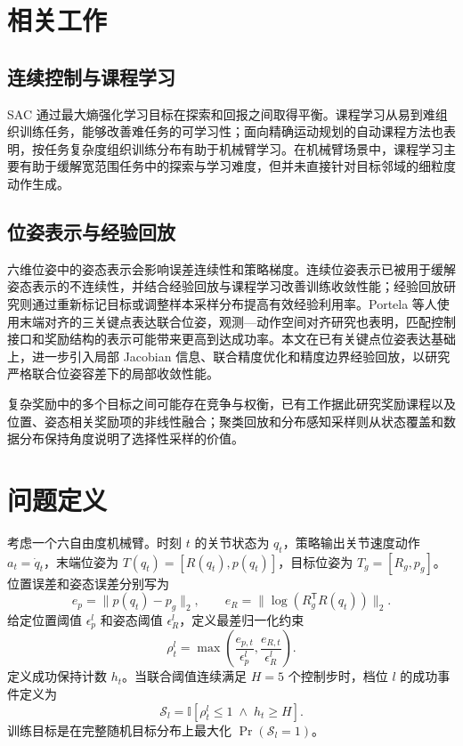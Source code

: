 \documentclass[conference]{IEEEtran}
\begin{document}
\section{相关工作}
\subsection{连续控制与课程学习}
SAC 通过最大熵强化学习目标在探索和回报之间取得平衡\cite{haarnoja2018sac}。课程学习从易到难组织训练任务，能够改善难任务的可学习性\cite{bengio2009curriculum}；面向精确运动规划的自动课程方法也表明，按任务复杂度组织训练分布有助于机械臂学习\cite{cho2025autocurriculum}。在机械臂场景中，课程学习主要有助于缓解宽范围任务中的探索与学习难度，但并未直接针对目标邻域的细粒度动作生成。

\subsection{位姿表示与经验回放}
六维位姿中的姿态表示会影响误差连续性和策略梯度。连续位姿表示已被用于缓解姿态表示的不连续性，并结合经验回放与课程学习改善训练收敛性能\cite{hu2025rtpc}；经验回放研究则通过重新标记目标或调整样本采样分布提高有效经验利用率\cite{andrychowicz2017her,schaul2016sac}。Portela 等人使用末端对齐的三关键点表达联合位姿\cite{portela2025wholebody}，观测—动作空间对齐研究也表明，匹配控制接口和奖励结构的表示可能带来更高到达成功率\cite{bhat2026alignment}。本文在已有关键点位姿表达基础上，进一步引入局部 Jacobian 信息、联合精度优化和精度边界经验回放，以研究严格联合位姿容差下的局部收敛性能。

复杂奖励中的多个目标之间可能存在竞争与权衡，已有工作据此研究奖励课程以及位置、姿态相关奖励项的非线性融合\cite{freitag2025complexreward,jiang2025rfm}；聚类回放和分布感知采样则从状态覆盖和数据分布保持角度说明了选择性采样的价值\cite{li2022clusteringreplay,garg2026distributionreplay}。

\section{问题定义}
考虑一个六自由度机械臂。时刻 $t$ 的关节状态为 $q_t$，策略输出关节速度动作 $a_t=\dot q_t$，末端位姿为 $T(q_t)=[R(q_t),p(q_t)]$，目标位姿为 $T_g=[R_g,p_g]$。位置误差和姿态误差分别写为
\begin{equation}
e_p=\|p(q_t)-p_g\|_2,
\qquad
e_R=\|\log(R_g^{\mathsf T}R(q_t))\|_2 .
\label{eq:pose_error}
\end{equation}
给定位置阈值 $\epsilon_p^l$ 和姿态阈值 $\epsilon_R^l$，定义最差归一化约束
\begin{equation}
\rho_t^l=\max\left(\frac{e_{p,t}}{\epsilon_p^l},\frac{e_{R,t}}{\epsilon_R^l}\right).
\label{eq:rho}
\end{equation}
定义成功保持计数 $h_t$。当联合阈值连续满足 $H=5$ 个控制步时，档位 $l$ 的成功事件定义为
\begin{equation}
\mathcal{S}_l=\mathbb{I}[\rho_t^l\leq1\;\wedge\;h_t\geq H].
\label{eq:success}
\end{equation}
训练目标是在完整随机目标分布上最大化 $\Pr(\mathcal{S}_l=1)$。
\end{document}
